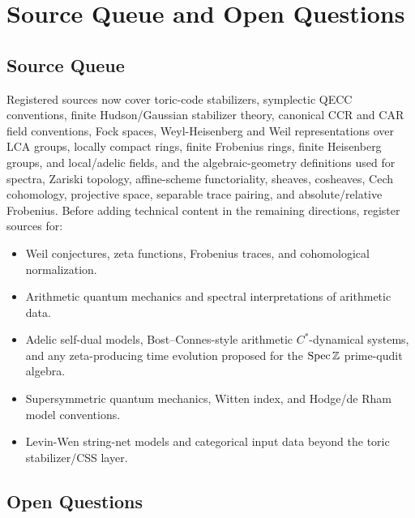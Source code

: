 
\section{Source Queue and Open Questions}

\subsection{Source Queue}

Registered sources now cover toric-code stabilizers, symplectic QECC
conventions, finite Hudson/Gaussian stabilizer theory, canonical CCR and CAR
field conventions, Fock spaces,
Weyl-Heisenberg and Weil representations over LCA groups, locally compact
rings, finite Frobenius rings, finite Heisenberg groups, and local/adelic
fields, and the algebraic-geometry definitions used for spectra, Zariski
topology, affine-scheme functoriality, sheaves, cosheaves, Cech cohomology,
projective space, separable trace pairing, and absolute/relative Frobenius.  Before
adding technical content in the remaining directions, register sources for:

\begin{itemize}
  \item Weil conjectures, zeta functions, Frobenius traces, and cohomological
  normalization.
  \item Arithmetic quantum mechanics and spectral interpretations of
  arithmetic data.
  \item Adelic self-dual models, Bost--Connes-style arithmetic
  \(C^*\)-dynamical systems, and any zeta-producing time evolution proposed for
  the \(\operatorname{Spec}\mathbb Z\) prime-qudit algebra.
  \item Supersymmetric quantum mechanics, Witten index, and Hodge/de Rham model
  conventions.
  \item Levin-Wen string-net models and categorical input data beyond the toric
  stabilizer/CSS layer.
\end{itemize}

\subsection{Open Questions}

